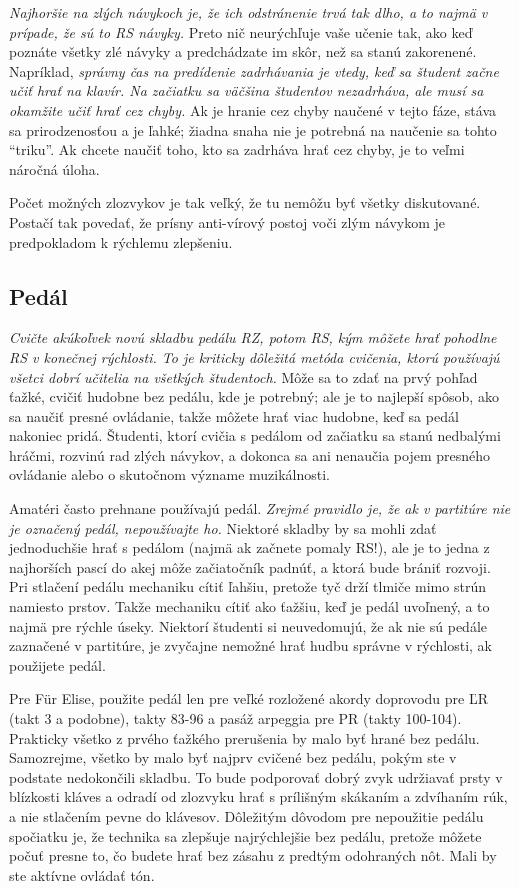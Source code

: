 \emph{Najhoršie na zlých návykoch je, že ich odstránenie trvá tak dlho, a to najmä v prípade, že sú to RS návyky.} Preto nič neurýchľuje vaše učenie tak, ako keď poznáte všetky zlé návyky a predchádzate im skôr, než sa stanú zakorenené. Napríklad, \emph{správny čas na predídenie zadrhávania je vtedy, keď sa študent začne učiť hrať na klavír. Na začiatku sa väčšina študentov nezadrháva, ale musí sa okamžite učiť hrať cez chyby.} Ak je hranie cez chyby naučené v tejto fáze, stáva sa prirodzenosťou a je ľahké; žiadna snaha nie je potrebná na naučenie sa tohto “triku”. Ak chcete naučiť toho, kto sa zadrháva hrať cez chyby, je to veľmi náročná úloha.

Počet možných zlozvykov je tak veľký, že tu nemôžu byť všetky diskutované. Postačí tak povedať, že prísny anti-vírový postoj voči zlým návykom je predpokladom k rýchlemu zlepšeniu.

\subsection{Pedál}
\emph{Cvičte akúkoľvek novú skladbu pedálu RZ, potom RS, kým môžete hrať pohodlne RS v konečnej rýchlosti. To je kriticky dôležitá metóda cvičenia, ktorú používajú všetci dobrí učitelia na všetkých študentoch.} Môže sa to zdať na prvý pohľad ťažké, cvičiť hudobne bez pedálu, kde je potrebný; ale je to najlepší spôsob, ako sa naučiť presné ovládanie, takže môžete hrať viac hudobne, keď sa pedál nakoniec pridá. Študenti, ktorí cvičia s pedálom od začiatku sa stanú nedbalými hráčmi, rozvinú rad zlých návykov, a dokonca sa ani nenaučia pojem presného ovládanie alebo o skutočnom význame muzikálnosti.

Amatéri často prehnane používajú pedál. \emph{Zrejmé pravidlo je, že ak v partitúre nie je označený pedál, nepoužívajte ho.} Niektoré skladby by sa mohli zdať jednoduchšie hrať s pedálom (najmä ak začnete pomaly RS!), ale je to jedna z najhorších pascí do akej môže začiatočník padnúť, a ktorá bude brániť rozvoji. Pri stlačení pedálu mechaniku cítiť ľahšiu, pretože tyč drží tlmiče mimo strún namiesto prstov. Takže mechaniku cítiť ako ťažšiu, keď je pedál uvoľnený, a to najmä pre rýchle úseky. Niektorí študenti si neuvedomujú, že ak nie sú pedále zaznačené v partitúre, je zvyčajne nemožné hrať hudbu správne v rýchlosti, ak použijete pedál.

Pre Für Elise, použite pedál len pre veľké rozložené akordy doprovodu pre ĽR (takt 3 a podobne), takty 83-96 a pasáž arpeggia pre PR (takty 100-104). Prakticky všetko z prvého ťažkého prerušenia by malo byť hrané bez pedálu. Samozrejme, všetko by malo byť najprv  cvičené bez pedálu, pokým ste v podstate nedokončili skladbu. To bude podporovať dobrý zvyk udržiavať prsty v blízkosti kláves a odradí od zlozvyku hrať s prílišným skákaním a zdvíhaním rúk, a nie stlačením pevne do klávesov. Dôležitým dôvodom pre nepoužitie pedálu spočiatku je, že technika sa zlepšuje najrýchlejšie bez pedálu, pretože môžete počuť presne to, čo budete hrať bez zásahu z predtým odohraných nôt. Mali by ste aktívne ovládať tón.

